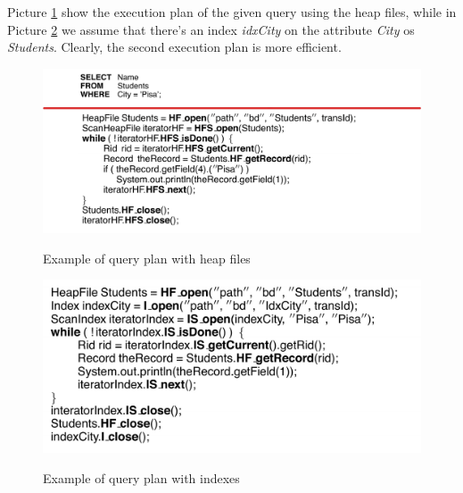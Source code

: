 Picture \ref{access2} show the execution plan of the given query using the heap files, while in Picture \ref{access3} we assume that there's an index \textit{idxCity} on the attribute \textit{City} os \textit{Students}. Clearly, the second execution plan is more efficient.

\begin{figure}[h!]
		\centering
		\includegraphics[scale = 0.7]{img/access2.jpg}
		\label{access2}
        \caption{Example of query plan with heap files}
\end{figure}

\begin{figure}[h!]
		\centering
		\includegraphics[scale = 0.7]{img/access3.jpg}
		\label{access3}
        \caption{Example of query plan with indexes}
\end{figure}